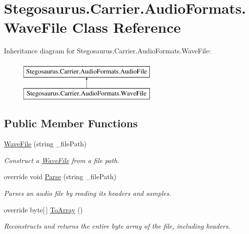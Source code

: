 \hypertarget{class_stegosaurus_1_1_carrier_1_1_audio_formats_1_1_wave_file}{}\section{Stegosaurus.\+Carrier.\+Audio\+Formats.\+Wave\+File Class Reference}
\label{class_stegosaurus_1_1_carrier_1_1_audio_formats_1_1_wave_file}
Inheritance diagram for Stegosaurus.\+Carrier.\+Audio\+Formats.\+Wave\+File\+:\begin{figure}[H]
\begin{center}
\leavevmode
\includegraphics[height=2.000000cm]{class_stegosaurus_1_1_carrier_1_1_audio_formats_1_1_wave_file}
\end{center}
\end{figure}
\subsection*{Public Member Functions}
\begin{DoxyCompactItemize}
\item 
\hyperlink{class_stegosaurus_1_1_carrier_1_1_audio_formats_1_1_wave_file_acab11a7e34412f40fbe7da33d7debd65}{Wave\+File} (string \+\_\+file\+Path)
\begin{DoxyCompactList}\small\item\em Construct a \hyperlink{class_stegosaurus_1_1_carrier_1_1_audio_formats_1_1_wave_file}{Wave\+File} from a file path. \end{DoxyCompactList}\item 
override void \hyperlink{class_stegosaurus_1_1_carrier_1_1_audio_formats_1_1_wave_file_aa18e174d66b4d3fefef8683b35946120}{Parse} (string \+\_\+file\+Path)
\begin{DoxyCompactList}\small\item\em Parses an audio file by reading its headers and samples. \end{DoxyCompactList}\item 
override byte\mbox{[}$\,$\mbox{]} \hyperlink{class_stegosaurus_1_1_carrier_1_1_audio_formats_1_1_wave_file_a3de2c6ede07d46d1bfc3082fcf07d015}{To\+Array} ()
\begin{DoxyCompactList}\small\item\em Reconstructs and returns the entire byte array of the file, including headers. \end{DoxyCompactList}\end{DoxyCompactItemize}
